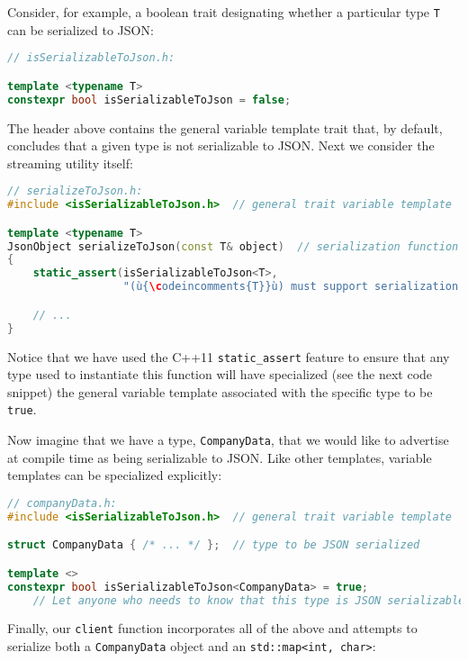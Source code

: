 {Consider, for example, a boolean trait designating whether a particular
type \texttt{T} can be serialized to JSON:

\begin{lstlisting}[language=C++]
// isSerializableToJson.h:

template <typename T>
constexpr bool isSerializableToJson = false;
\end{lstlisting}

\noindent The header above contains the general variable template trait that, by
default, concludes that a given type is not serializable to JSON. Next
we consider the streaming utility itself:

\begin{lstlisting}[language=C++]
// serializeToJson.h:
#include <isSerializableToJson.h>  // general trait variable template

template <typename T>
JsonObject serializeToJson(const T& object)  // serialization function template
{
    static_assert(isSerializableToJson<T>,
                  "(ù{\codeincomments{T}}ù) must support serialization to JSON.");

    // ...
}
\end{lstlisting}

\noindent Notice that we have used the C++11
\texttt{static\_assert} feature to ensure that any type
used to instantiate this function will have specialized (see the next code snippet) the
general variable template associated with the specific type to be
\texttt{true}.

Now imagine that we have a type, \texttt{CompanyData}, that we would
like to advertise at compile time as being serializable to JSON. Like
other templates, variable templates can be specialized explicitly:

\begin{lstlisting}[language=C++]
// companyData.h:
#include <isSerializableToJson.h>  // general trait variable template

struct CompanyData { /* ... */ };  // type to be JSON serialized

template <>
constexpr bool isSerializableToJson<CompanyData> = true;
    // Let anyone who needs to know that this type is JSON serializable.
\end{lstlisting}

\noindent Finally, our \texttt{client} function incorporates all of the above and
attempts to serialize both a \texttt{CompanyData} object and an
\texttt{std::map<int,}~\texttt{char>}:

}
